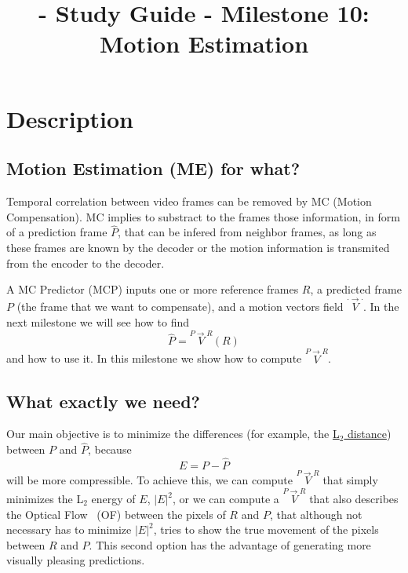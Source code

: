 
\title{\SM{} - Study Guide - Milestone 10: Motion Estimation}

\maketitle

\tableofcontents

\section{Description}

\subsection{Motion Estimation (ME) for what?}
Temporal correlation between video frames can be removed by MC (Motion
Compensation). MC implies to substract to the frames those
information, in form of a prediction frame $\hat{P}$, that can be
infered from neighbor frames, as long as these frames are known by the
decoder or the motion information is transmited from the encoder to
the decoder.

A MC Predictor (MCP) inputs one or more reference frames $R$, a
predicted frame $P$ (the frame that we want to compensate), and a
motion vectors field $\overset{\cdot\rightarrow\cdot}{V}$. In the next
milestone we will see how to find
\begin{equation}
  \hat{P} =  \overset{P\rightarrow R}{V}(R)
\end{equation}
and how to use it. In this milestone we show how to compute
$\overset{P\rightarrow R}{V}$.

\subsection{What exactly we need?}
Our main objective is to minimize the differences (for example, the
\href{https://en.wikipedia.org/wiki/Euclidean_distance}{L$_2$
  distance}) between $P$ and $\hat{P}$, because
\begin{equation}
  E=P-\hat{P}
\end{equation}
will be more compressible. To achieve this, we can compute
$\overset{P\rightarrow R}{V}$ that simply minimizes the L$_2$ energy
of $E$, $|E|^2$, or we can compute a $\overset{P\rightarrow R}{V}$
that also describes the Optical Flow~\cite{horn1981determining} (OF)
between the pixels of $R$ and $P$, that although not necessary has to
minimize $|E|^2$, tries to show the true movement of the pixels
between $R$ and $P$. This second option has the advantage of generating
more visually pleasing predictions.

